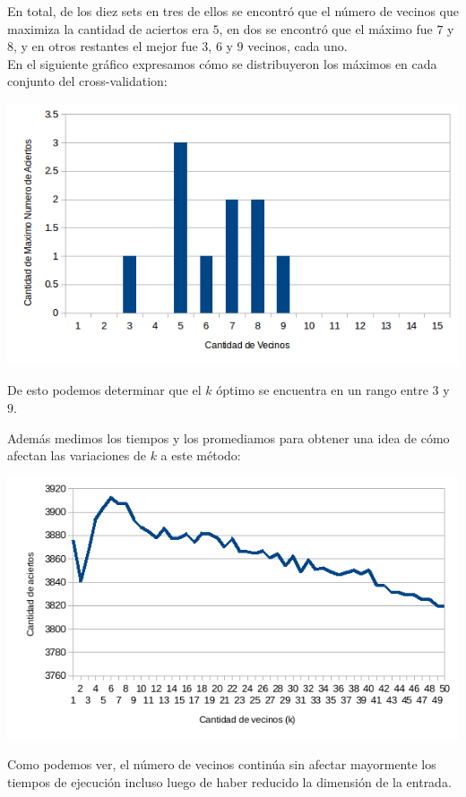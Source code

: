 En total, de los diez sets en tres de ellos se encontró que el número de vecinos que maximiza la cantidad de aciertos era $5$, en dos se encontró que el máximo fue $7$ y $8$, y en otros restantes el mejor fue $3$, $6$ y $9$ vecinos, cada uno.
\\
En el siguiente gráfico expresamos cómo se distribuyeron los máximos en cada conjunto del cross-validation:
\begin{center}
\includegraphics[scale=0.6]{nuevosResultados/pca/k/mejores.png}\\
\end{center}
De esto podemos determinar que el $k$ óptimo se encuentra en un rango entre $3$ y $9$.

Además medimos los tiempos y los promediamos para obtener una idea de cómo afectan las variaciones de $k$ a este método:
\begin{center}
\includegraphics[scale=0.6]{nuevosResultados/pca/k/temp.png}\\
\end{center}

Como podemos ver, el número de vecinos continúa sin afectar mayormente los tiempos de ejecución incluso luego de haber reducido la dimensión de la entrada.


